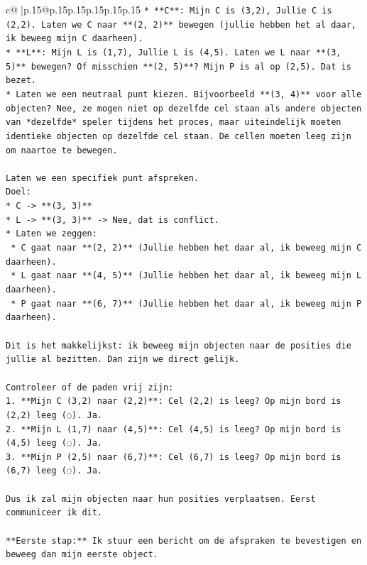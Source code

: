 \documentclass{article}
\begin{document}
{\begin{supertabular}{c@{$\;$}|p{.15\linewidth}@{}p{.15\linewidth}p{.15\linewidth}p{.15\linewidth}p{.15\linewidth}p{.15\linewidth}}
{{{\texttt{*   **C**: Mijn C is (3,2), Jullie C is (2,2). Laten we C naar **(2, 2)** bewegen (jullie hebben het al daar, ik beweeg mijn C daarheen).} \\
\texttt{*   **L**: Mijn L is (1,7), Jullie L is (4,5). Laten we L naar **(3, 5)** bewegen? Of misschien **(2, 5)**? Mijn P is al op (2,5). Dat is bezet.} \\
\texttt{*   Laten we een neutraal punt kiezen. Bijvoorbeeld **(3, 4)** voor alle objecten? Nee, ze mogen niet op dezelfde cel staan als andere objecten van *dezelfde* speler tijdens het proces, maar uiteindelijk moeten identieke objecten op dezelfde cel staan. De cellen moeten leeg zijn om naartoe te bewegen.} \\
\\ 
\texttt{Laten we een specifiek punt afspreken.} \\
\texttt{Doel:} \\
\texttt{*   C {-}> **(3, 3)**} \\
\texttt{*   L {-}> **(3, 3)** {-}> Nee, dat is conflict.} \\
\texttt{*   Laten we zeggen:} \\
\texttt{    *   C gaat naar **(2, 2)** (Jullie hebben het daar al, ik beweeg mijn C daarheen).} \\
\texttt{    *   L gaat naar **(4, 5)** (Jullie hebben het daar al, ik beweeg mijn L daarheen).} \\
\texttt{    *   P gaat naar **(6, 7)** (Jullie hebben het daar al, ik beweeg mijn P daarheen).} \\
\\ 
\texttt{Dit is het makkelijkst: ik beweeg mijn objecten naar de posities die jullie al bezitten. Dan zijn we direct gelijk.} \\
\\ 
\texttt{Controleer of de paden vrij zijn:} \\
\texttt{1.  **Mijn C (3,2) naar (2,2)**: Cel (2,2) is leeg? Op mijn bord is (2,2) leeg (◌). Ja.} \\
\texttt{2.  **Mijn L (1,7) naar (4,5)**: Cel (4,5) is leeg? Op mijn bord is (4,5) leeg (◌). Ja.} \\
\texttt{3.  **Mijn P (2,5) naar (6,7)**: Cel (6,7) is leeg? Op mijn bord is (6,7) leeg (◌). Ja.} \\
\\ 
\texttt{Dus ik zal mijn objecten naar hun posities verplaatsen. Eerst communiceer ik dit.} \\
\\ 
\texttt{**Eerste stap:** Ik stuur een bericht om de afspraken te bevestigen en beweeg dan mijn eerste object.} \\
}}}
\end{supertabular}}
\end{document}
